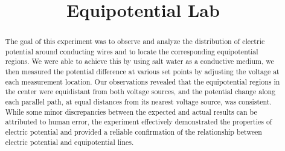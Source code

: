 \documentclass[conference]{IEEEtran}
\begin{document}
\title{Equipotential Lab\\
}

\author{
\and
{}
\and
{}
\and
{}
\and
{}
\and
{}
\and
{}
}

\maketitle

\begin{abstract}
The goal of this experiment was to observe and analyze the distribution of electric potential around conducting wires and to locate the corresponding equipotential regions. We were able to achieve this by using salt water as a conductive medium, we then measured the potential difference at various set points by adjusting the voltage at each measurement location. Our observations revealed that the equipotential regions in the center were equidistant from both voltage sources, and the potential change along each parallel path, at equal distances from its nearest voltage source, was consistent. While some minor discrepancies between the expected and actual results can be attributed to human error, the experiment effectively demonstrated the properties of electric potential and provided a reliable confirmation of the relationship between electric potential and equipotential lines.
\end{abstract}
\end{document}
